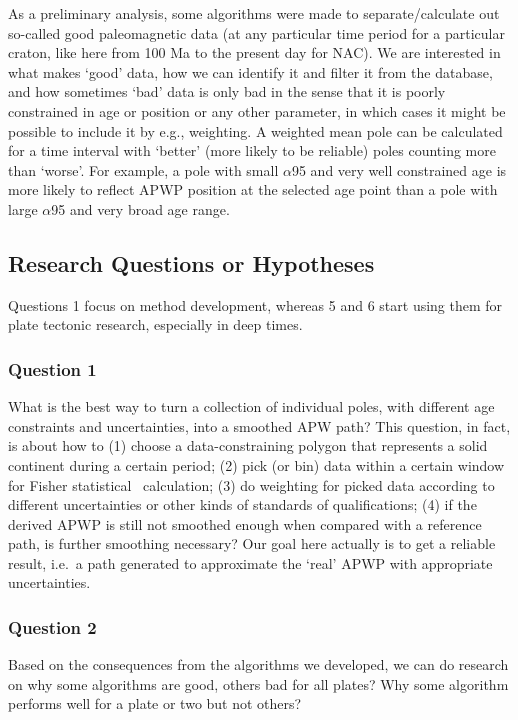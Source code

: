 As a preliminary analysis, some algorithms were made to separate/calculate out
so-called good paleomagnetic data (at any particular time period for a
particular craton, like here from 100 Ma to the present day for NAC). We are
interested in what makes `good' data, how we can identify it and filter it from
the database, and how sometimes `bad' data is only bad in the sense that it is
poorly constrained in age or position or any other parameter, in which cases it
might be possible to include it by e.g., weighting. A weighted mean pole can be
calculated for a time interval with `better' (more likely to be reliable) poles
counting more than `worse'. For example, a pole with small $\alpha$95 and very
well constrained age is more likely to reflect APWP position at the selected age
point than a pole with large $\alpha$95 and very broad age range.

\subsection{Research Questions or Hypotheses}

Questions 1 focus on method development, whereas 5 and 6 start
using them for plate tectonic research, especially in deep times.

\subsubsection{Question 1}

What is the best way to turn a collection of individual poles, with different
age constraints and uncertainties, into a smoothed APW path? This question, in
fact, is about how to (1) choose a data-constraining polygon that represents a
solid continent during a certain period; (2) pick (or bin) data within a certain
window for Fisher statistical~\cite{F53} calculation; (3) do weighting for
picked data according to different uncertainties or other kinds of standards of
qualifications; (4) if the derived APWP is still not smoothed enough when
compared with a reference path, is further smoothing necessary? Our goal here
actually is to get a reliable result, i.e.\ a path generated to approximate the
`real' APWP with appropriate uncertainties.

\subsubsection{Question 2}

Based on the consequences from the algorithms we developed, we can do research
on why some algorithms are good, others bad for all plates? Why some algorithm
performs well for a plate or two but not others?

